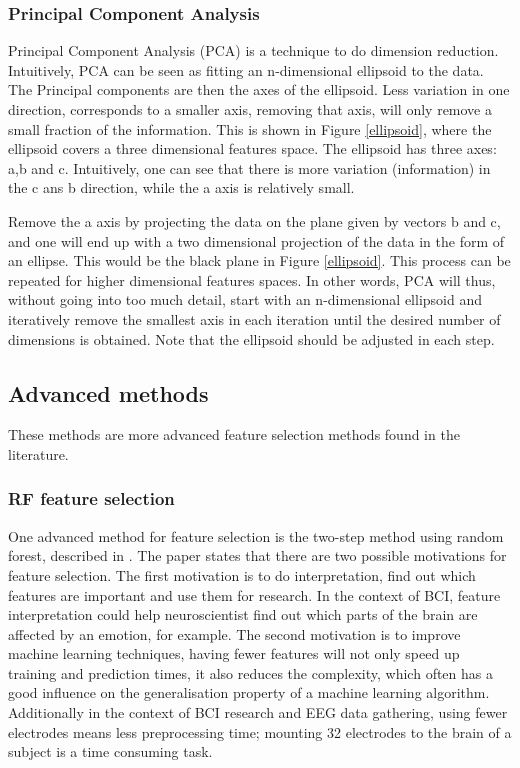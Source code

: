 
\subsubsection{Principal Component Analysis}
Principal Component Analysis (PCA)  is a technique to do dimension reduction. Intuitively, PCA can be seen as fitting an n-dimensional ellipsoid to the data. The Principal components are then the axes of the ellipsoid. Less variation in one direction, corresponds to a smaller axis, removing that axis, will only remove a small fraction of the information. This is shown in Figure \ref{ellipsoid}, where the ellipsoid covers a three dimensional features space. The ellipsoid has three axes: a,b and c. Intuitively, one can see that there is more variation (information) in the c ans b direction, while the a axis is relatively small.


Remove the a axis by projecting the data on the plane given by vectors b and c, and one will end up with a two dimensional projection of the data in the form of an ellipse. This would be the black plane in Figure \ref{ellipsoid}. This process can be repeated for higher dimensional features spaces. In other words, PCA will thus, without going into too much detail, start with an n-dimensional ellipsoid and iteratively remove the smallest axis in each iteration until the desired number of dimensions is obtained. Note that the ellipsoid should be adjusted in each step.

\subsection{Advanced methods}
These methods are more advanced feature selection methods found in the literature.

\subsubsection{RF feature selection}
One advanced method for feature selection is the two-step method using random forest, described in \citep{rfPaper}. The paper states that there are two possible motivations for feature selection. The first motivation is to do interpretation, find out which features are important and use them for research. In the context of BCI, feature interpretation could help neuroscientist find out which parts of the brain are affected by an emotion, for example. The second motivation is to improve machine learning techniques, having fewer features will not only speed up training and prediction times, it also reduces the complexity, which often has a good influence on the generalisation property of a machine learning algorithm. Additionally in the context of BCI research and EEG data gathering, using fewer electrodes means less preprocessing time; mounting 32 electrodes to the brain of a subject is a time consuming task.

